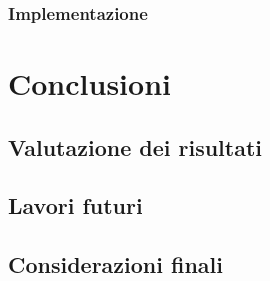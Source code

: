 \documentclass[%
  a4paper,                %
  12pt,                   %
  twoside,                %
  openright,              %
  titlepage,              %
  final                   %
]{scrbook}
\begin{document}
      \section{Implementazione}

  \part{Conclusioni}
    \chapter{Valutazione dei risultati}
    \chapter{Lavori futuri}
    \chapter{Considerazioni finali}

  \appendix
  

  \backmatter{}
  
  
\end{document}
